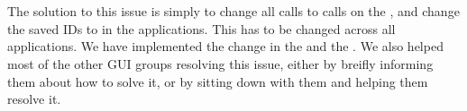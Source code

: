 \\\\
The solution to this issue is simply to change all  calls to  calls on the , and change the saved IDs to  in the applications. This has to be changed across all applications. We have implemented the change in the \launcher and the \ct. We also helped most of the other GUI groups resolving this issue, either by breifly informing them about how to solve it, or by sitting down with them and helping them resolve it.